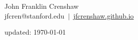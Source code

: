 \documentclass[11pt]{article}
\begin{document}
\begin{center}
    {\huge John Franklin Crenshaw} \\[6pt]
    jfcren@stanford.edu  $\,|\,$
    \href{http://jfcrenshaw.github.io}{jfcrenshaw.github.io}
\end{center}






%






% 

\vfill \hfill
updated: \today
\end{document}
